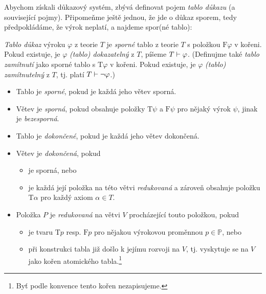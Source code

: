 Abychom získali důkazový systém, zbývá definovat pojem \emph{tablo důkazu} (a související pojmy). Připomeňme ještě jednou, že jde o důkaz sporem, tedy předpokládáme, že výrok neplatí, a najdeme spor(né tablo):

\begin{definition}
\emph{Tablo důkaz} výroku $\varphi$ z teorie $T$ je \emph{sporné} tablo z teorie $T$ s položkou $\mathrm{F}\varphi$ v kořeni. Pokud existuje, je $\varphi$ \emph{(tablo) dokazatelný} z $T$, píšeme $T\vdash\varphi$. (Definujme také \emph{tablo zamítnutí} jako sporné tablo s $\mathrm{T}\varphi$ v kořeni. Pokud existuje, je $\varphi$ \emph{(tablo) zamítnutelný} z $T$, tj. platí $T\vdash\neg\varphi$.)  
\begin{itemize}
    \item Tablo je \emph{sporné}, pokud je každá jeho větev sporná.
    \item Větev je \emph{sporná}, pokud obsahuje položky $\mathrm{T}\psi$ a $\mathrm{F}\psi$ pro nějaký výrok $\psi$, jinak je \emph{bezesporná}.
    \item Tablo je \emph{dokončené}, pokud je každá jeho větev dokončená.
    \item Větev je \emph{dokončená}, pokud 
    \begin{itemize}
        \item je sporná, nebo
        \item je každá její položka na této větvi \emph{redukovaná} a zároveň obsahuje položku $\mathrm{T}\alpha$ pro každý axiom $\alpha\in T$.
    \end{itemize}
     
    \item Položka $P$ je \emph{redukovaná} na větvi $V$ procházející touto položkou, pokud 
    \begin{itemize}
        \item je tvaru $\mathrm{T}p$ resp. $\mathrm{F}p$ pro nějakou výrokovou proměnnou $p\in\mathbb P$, nebo
        \item při konstrukci tabla již došlo k jejímu rozvoji na $V$, tj. vyskytuje se na $V$ jako kořen atomického tabla.\footnote{Byť podle konvence tento kořen nezapisujeme.}
    \end{itemize}
\end{itemize}
\end{definition}

